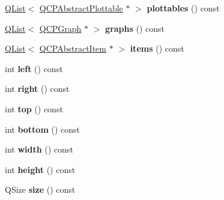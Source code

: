 \begin{DoxyCompactItemize}
\item 
\mbox{\label{class_q_c_p_axis_rect_a13c381be50fa0322ac419d37bbbf58c7}} 
\hyperlink{class_q_list}{Q\+List}$<$ \hyperlink{class_q_c_p_abstract_plottable}{Q\+C\+P\+Abstract\+Plottable} $\ast$ $>$ {\bfseries plottables} () const
\item 
\mbox{\label{class_q_c_p_axis_rect_ab90915b81894575f18b2799dac04be1c}} 
\hyperlink{class_q_list}{Q\+List}$<$ \hyperlink{class_q_c_p_graph}{Q\+C\+P\+Graph} $\ast$ $>$ {\bfseries graphs} () const
\item 
\mbox{\label{class_q_c_p_axis_rect_a959d2936f3b688e3ae6044b01891dc84}} 
\hyperlink{class_q_list}{Q\+List}$<$ \hyperlink{class_q_c_p_abstract_item}{Q\+C\+P\+Abstract\+Item} $\ast$ $>$ {\bfseries items} () const
\item 
\mbox{\label{class_q_c_p_axis_rect_afb4a3de02046b20b9310bdb8fca781c3}} 
int {\bfseries left} () const
\item 
\mbox{\label{class_q_c_p_axis_rect_a3f819d4a1b2193723d1fdafc573eea10}} 
int {\bfseries right} () const
\item 
\mbox{\label{class_q_c_p_axis_rect_a45dbad181cbb9f09d068dbb76c817c95}} 
int {\bfseries top} () const
\item 
\mbox{\label{class_q_c_p_axis_rect_acefdf1abaa8a8ab681e906cc2be9581e}} 
int {\bfseries bottom} () const
\item 
\mbox{\label{class_q_c_p_axis_rect_a204645398a4f9d0b0189385c7c2cfb91}} 
int {\bfseries width} () const
\item 
\mbox{\label{class_q_c_p_axis_rect_acc4377809e79d9a089ab790f39429b0d}} 
int {\bfseries height} () const
\item 
\mbox{\label{class_q_c_p_axis_rect_a7a8289346eb612f422c704f8b75cf479}} 
Q\+Size {\bfseries size} () const
\item 
\mbox{\label{class_q_c_p_axis_rect_a5a847b3ddeca3abec38d3838fefb0dbd}} 

\end{DoxyCompactItemize}

